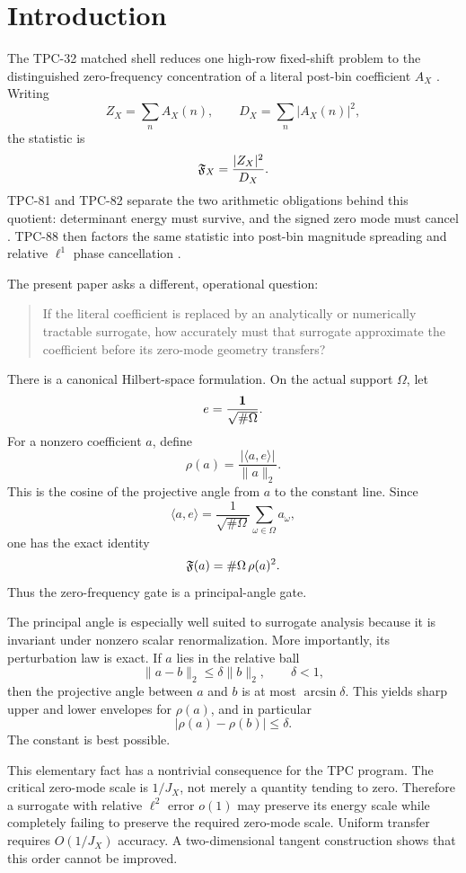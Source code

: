 \section{Introduction}
\label{sec:introduction}

The TPC-32 matched shell reduces one high-row fixed-shift problem to
the distinguished zero-frequency concentration of a literal
post-bin coefficient \(A_X\) \citep{WangTPC32}.  Writing
\[
 Z_X=\sum_nA_X(n),\qquad
 D_X=\sum_n|A_X(n)|^2,
\]
the statistic is
\[
 \mathfrak F_X=\frac{|Z_X|^2}{D_X}.
\]
TPC-81 and TPC-82 separate the two arithmetic obligations behind
this quotient: determinant energy must survive, and the signed zero
mode must cancel \citep{WangTPC81,WangTPC82}.  TPC-88 then factors
the same statistic into post-bin magnitude spreading and relative
\(\ell^1\) phase cancellation \citep{WangTPC88}.

The present paper asks a different, operational question:

\begin{quote}
If the literal coefficient is replaced by an analytically or
numerically tractable surrogate, how accurately must that surrogate
approximate the coefficient before its zero-mode geometry transfers?
\end{quote}

There is a canonical Hilbert-space formulation.  On the actual
support \(\Omega\), let
\[
 e=\frac{\mathbf 1}{\sqrt{\#\Omega}}.
\]
For a nonzero coefficient \(a\), define
\[
 \rho(a)=\frac{|\langle a,e\rangle|}{\|a\|_2}.
\]
This is the cosine of the projective angle from \(a\) to the constant
line.  Since
\[
 \langle a,e\rangle=\frac{1}{\sqrt{\#\Omega}}\sum_{\omega\in\Omega}
 a_\omega,
\]
one has the exact identity
\[
 \mathfrak F(a)=\#\Omega\,\rho(a)^2.
\]
Thus the zero-frequency gate is a principal-angle gate.

The principal angle is especially well suited to surrogate
analysis because it is invariant under nonzero scalar
renormalization.  More importantly, its perturbation law is exact.
If \(a\) lies in the relative ball
\[
 \|a-b\|_2\le\delta\|b\|_2,\qquad \delta<1,
\]
then the projective angle between \(a\) and \(b\) is at most
\(\arcsin\delta\).  This yields sharp upper and lower envelopes for
\(\rho(a)\), and in particular
\[
 |\rho(a)-\rho(b)|\le\delta.
\]
The constant is best possible.

This elementary fact has a nontrivial consequence for the TPC
program.  The critical zero-mode scale is \(1/J_X\), not merely a
quantity tending to zero.  Therefore a surrogate with relative
\(\ell^2\) error \(o(1)\) may preserve its energy scale while
completely failing to preserve the required zero-mode scale.
Uniform transfer requires \(O(1/J_X)\) accuracy.  A two-dimensional
tangent construction shows that this order cannot be improved.

